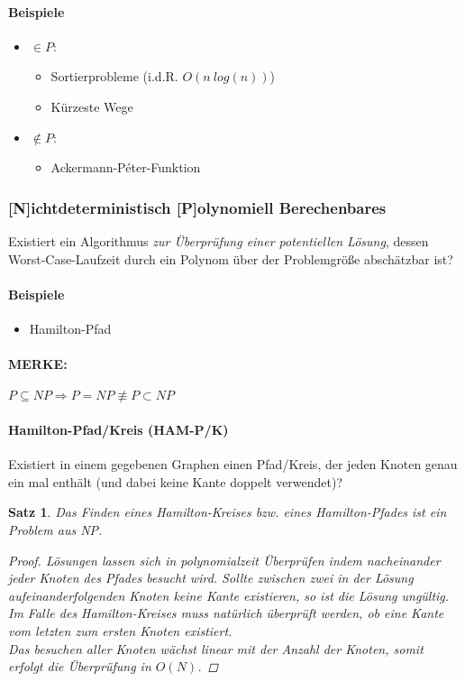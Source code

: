\documentclass{article}
\begin{document}
\paragraph*{Beispiele}
\begin{itemize}
    \item $\in P$:
          \begin{itemize}
              \item Sortierprobleme (i.d.R. $O(n\:log(n))$)
              \item Kürzeste Wege
          \end{itemize}
    \item $\notin P$:
          \begin{itemize}
              \item Ackermann-P\'eter-Funktion
          \end{itemize}
\end{itemize}
\subsubsection{[N]ichtdeterministisch [P]olynomiell Berechenbares}
Existiert ein Algorithmus \emph{zur Überprüfung einer potentiellen Lösung}, dessen Worst-Case-Laufzeit durch ein Polynom über der Problemgröße abschätzbar ist?
\paragraph*{Beispiele}
\begin{itemize}
    \item Hamilton-Pfad
\end{itemize}
\paragraph*{MERKE:}
$P \subseteq NP \Rightarrow P = NP\not\equiv P \subset NP$
\paragraph*{Hamilton-Pfad/Kreis (HAM-P/K)}
Existiert in einem gegebenen Graphen einen Pfad/Kreis, der jeden Knoten genau ein mal enthält (und dabei keine Kante doppelt verwendet)?
\newtheorem*{hamiltonnp}{Satz}
\begin{framed}
    \begin{hamiltonnp}
        Das Finden eines Hamilton-Kreises bzw. eines Hamilton-Pfades ist ein Problem aus NP. 
        \begin{proof}
            Lösungen lassen sich in polynomialzeit Überprüfen indem nacheinander jeder Knoten des Pfades besucht wird. Sollte zwischen zwei in der Lösung aufeinanderfolgenden Knoten keine Kante existieren, so ist die Lösung ungültig. Im Falle des Hamilton-Kreises muss natürlich überprüft werden, ob eine Kante vom letzten zum ersten Knoten existiert.\\
            Das besuchen aller Knoten wächst linear mit der Anzahl der Knoten, somit erfolgt die Überprüfung in $O(N)$.
        \end{proof}
    \end{hamiltonnp}
\end{framed}
\end{document}
